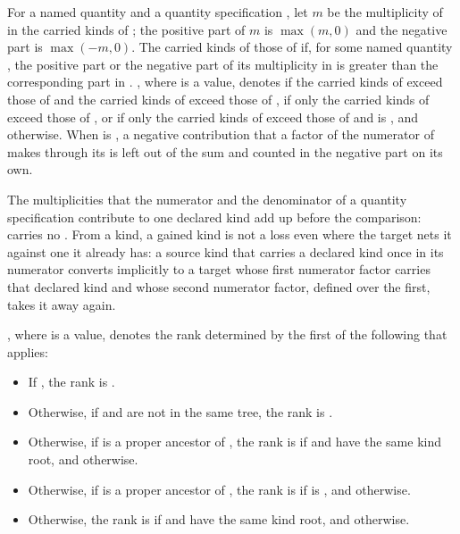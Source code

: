 \pnum
For a named quantity  and a quantity specification ,
let $m$ be the multiplicity of  in the carried kinds of ;
the positive part of $m$ is $\max(m, 0)$ and the negative part is $\max(-m, 0)$.
The carried kinds of   those of  if,
for some named quantity ,
the positive part or the negative part of its multiplicity in  is
greater than the corresponding part in .
, where  is a  value, denotes
 if the carried kinds of  exceed those of  and
the carried kinds of  exceed those of ,
 if only the carried kinds of  exceed those of ,
or if only the carried kinds of  exceed those of  and  is ,
and  otherwise.
When  is , a negative contribution that a factor of the numerator of 
makes through its  is left out of the sum and counted in the negative part on its own.
\begin{note}
The multiplicities that the numerator and the denominator of a quantity specification contribute
to one declared kind add up before the comparison:
carries no .
From a kind, a gained kind is not a loss even where the target nets it against one it already has:
a source kind that carries a declared kind once in its numerator converts implicitly to
a target whose first numerator factor carries that declared kind
and whose second numerator factor, defined over the first, takes it away again.
\end{note}

\pnum
{}, where  is a  value, denotes
the rank determined by the first of the following that applies:
\begin{itemize}
\item
If , the rank is .
\item
Otherwise, if  and  are not in the same tree, the rank is .
\item
Otherwise, if  is a proper ancestor of ,
the rank is  if  and  have the same kind root,
and  otherwise.
\item
Otherwise, if  is a proper ancestor of ,
the rank is  if  is , and  otherwise.
\item
Otherwise, the rank is  if  and  have the same kind root,
and  otherwise.
\end{itemize}

